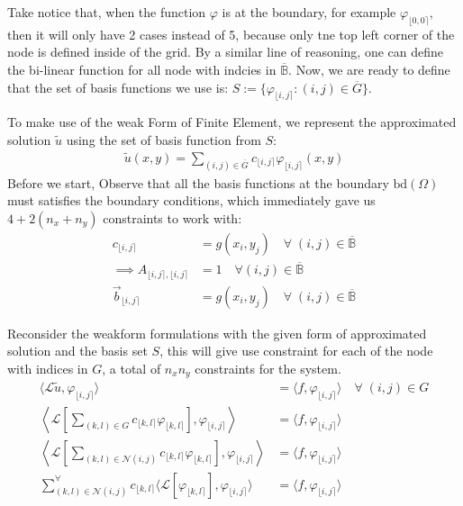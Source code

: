\documentclass[]{article}
\begin{document}
    Take notice that, when the function $\varphi$ is at the boundary, for example $\varphi_{\lfloor 0, 0\rceil}$, then it will only have 2 cases instead of 5, because only tne top left corner of the node is defined inside of the grid. By a similar line of reasoning, one can define the bi-linear function for all node with indcies in $\overline{\mathbb{B}}$. Now, we are ready to define that the set of basis functions we use is: $S:= \{\varphi_{\lfloor i,j \rceil}: (i, j)\in \overline{G}\}$. 
    \par
    To make use of the weak Form of Finite Element, we represent the approximated solution $\tilde{u}$ using the set of basis function from $S$: 
    \begin{align*}\tag{3.5}\label{eqn:3.5}
        \tilde{u}(x,y) = 
        \sum_{(i, j)\in \overline{G}}^{}
        c_{\lfloor i,j \rceil}\varphi_{\lfloor i,j \rceil}(x, y)
    \end{align*}
    Before we start, Observe that all the basis functions at the boundary $\text{bd}(\Omega)$ must satisfies the boundary conditions, which immediately gave us $4 + 2(n_x + n_y)$ constraints to work with: 
    \begin{align*}\tag{3.6}\label{eqn:3.6}
        c_{\lfloor i, j\rceil} &= g(x_i, y_j) \quad \forall \; (i, j) \in \overline{\mathbb{B}}
        \\
        \implies
        A_{\lfloor i, j\rceil, \lfloor i, j\rceil} &= 
        1 \quad \forall (i, j) \in \overline{\mathbb{B}}
        \\
        \vec{b}_{\lfloor i,j \rceil} &= g(x_i, y_j)  
        \quad \forall \; (i, j) \in \overline{\mathbb{B}}
    \end{align*}
    \par
    Reconsider the weakform formulations with the given form of approximated solution and the basis set $S$, this will give use constraint for each of the node with indices in $G$, a total of $n_xn_y$ constraints for the system. 
    \begin{align*}\tag{3.7}\label{eqn:3.7}
        \langle \mathcal{L}\tilde{u}, \varphi_{\lfloor i,j \rceil}\rangle &= \langle f, \varphi_{\lfloor i,j \rceil}\rangle \quad \forall \; (i, j) \in G
        \\
        \left\langle 
        \mathcal{L}\left[
            \sum_{(k, l)\in G}^{}
            c_{\lfloor k, l\rceil}\varphi_{
                \lfloor k, l\rceil
            }
            \right], 
            \varphi_{\lfloor i,j \rceil}\right\rangle 
            &= \langle f, \varphi_{\lfloor i,j \rceil}
        \rangle
        \\
        \left\langle 
        \mathcal{L}\left[
            \sum_{(k, l)\in \mathcal{N}(i, j)}^{}
            c_{\lfloor k, l\rceil}\varphi_{
                \lfloor k, l\rceil
            }
            \right], 
            \varphi_{\lfloor i,j \rceil}\right\rangle 
            &= \langle f, \varphi_{\lfloor i,j \rceil}
        \rangle
        \\
        \sum_{(k, l)\in\mathcal{N}(i, j)}^{\forall}c_{\lfloor k, l\rceil}
        \langle \mathcal{L}[\varphi_{\lfloor k,l \rceil}], \varphi_{\lfloor i, j \rceil}\rangle
        &= \langle f, \varphi_{\lfloor i, j \rceil}\rangle
    \end{align*}
\end{document}
